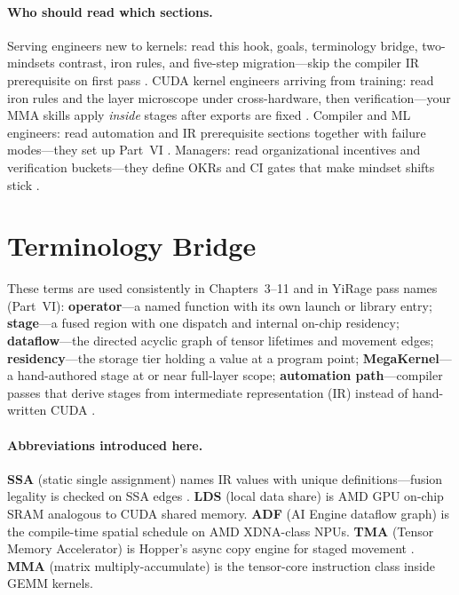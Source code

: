 \paragraph{Who should read which sections.}
Serving engineers new to kernels: read this hook, goals, terminology bridge, two-mindsets contrast, iron rules, and five-step migration---skip the compiler IR prerequisite on first pass \citep{patel2025llminference}.
CUDA kernel engineers arriving from training: read iron rules and the layer microscope under cross-hardware, then verification---your MMA skills apply \emph{inside} stages after exports are fixed \citep{taxbreak2026}.
Compiler and ML engineers: read automation and IR prerequisite sections together with failure modes---they set up Part~VI \citep{yirage2026,chen2020compilerbasedhardw}.
Managers: read organizational incentives and verification buckets---they define OKRs and CI gates that make mindset shifts stick \citep{memoryfloor2026}.

\section{Terminology Bridge}
\label{sec:glossary_bridge}

These terms are used consistently in Chapters~3--11 and in YiRage pass names (Part~VI):
\textbf{operator}---a named function with its own launch or library entry;
\textbf{stage}---a fused region with one dispatch and internal on-chip residency;
\textbf{dataflow}---the directed acyclic graph of tensor lifetimes and movement edges;
\textbf{residency}---the storage tier holding a value at a program point;
\textbf{MegaKernel}---a hand-authored stage at or near full-layer scope;
\textbf{automation path}---compiler passes that derive stages from intermediate representation (IR) instead of hand-written CUDA \citep{yirage2026,chen2020compilerbasedhardw}.

\paragraph{Abbreviations introduced here.}
\textbf{SSA} (static single assignment) names IR values with unique definitions---fusion legality is checked on SSA edges \citep{chen2020compilerbasedhardw}.
\textbf{LDS} (local data share) is AMD GPU on-chip SRAM analogous to CUDA shared memory.
\textbf{ADF} (AI Engine dataflow graph) is the compile-time spatial schedule on AMD XDNA-class NPUs.
\textbf{TMA} (Tensor Memory Accelerator) is Hopper's async copy engine for staged movement \citep{nvidia2022hopper}.
\textbf{MMA} (matrix multiply-accumulate) is the tensor-core instruction class inside GEMM kernels.

